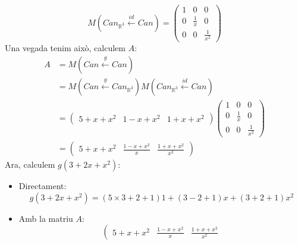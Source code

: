 \documentclass[a4paper, 12pt]{article}
\begin{document}
\begin{solucio}
        \begin{displaymath}
            M(Can_{\mathbb{R}^3} \xleftarrow{id} Can) = \left(
                \begin{array}{ccc}
                    1 & 0 & 0\\
                    0 & \frac{1}{x} & 0\\
                    0 & 0 & \frac{1}{x^2}
                \end{array}
            \right)
        \end{displaymath}
        Una vegada tenim això, calculem $A$:
        \begin{align*}
            A &= M(Can \xleftarrow{g} Can)\\
            &= M(Can \xleftarrow{g} Can_{\mathbb{R}^3}) M(Can_{\mathbb{R}^3} \xleftarrow{id} Can)\\
            &=
            \left(
                \begin{array}{ccc}
                    5+x+x^2&1-x+x^2&1+x+x^2
                \end{array}
            \right)
            \left(
                \begin{array}{ccc}
                    1 & 0 & 0\\
                    0 & \frac{1}{x} & 0\\
                    0 & 0 & \frac{1}{x^2}
                \end{array}
            \right)\\
            &=
            \left(
                \begin{array}{ccc}
                    5+x+x^2 & \frac{1-x+x^2}{x} & \frac{1+x+x^2}{x^2}
                \end{array}
            \right)
        \end{align*}
        Ara, calculem $g(3+2x+x^2)$:
        \begin{itemize}
            \item Directament:
            \begin{displaymath}
                g(3+2x+x^2) = (5\times 3+2+1)1+(3-2+1)x+(3+2+1)x^2
            \end{displaymath}
            \item Amb la matriu $A$:
            \begin{displaymath}
                \left(
                    \begin{array}{ccc}
                        5+x+x^2 & \frac{1-x+x^2}{x} & \frac{1+x+x^2}{x^2}
                    \end{array}

\end{displaymath}
\end{itemize}
\end{solucio}
\end{document}
